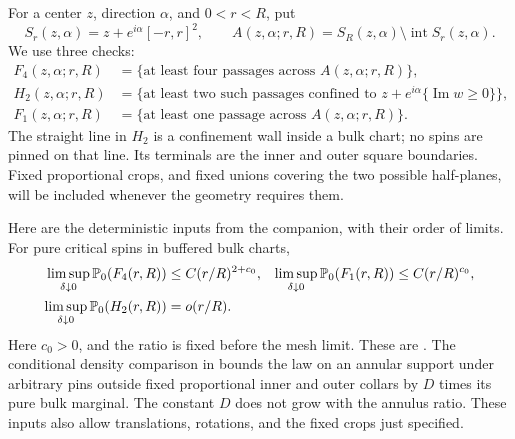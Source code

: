For a center $z$, direction $\alpha$, and $0<r<R$, put
\[
 S_r(z,\alpha)=z+e^{i\alpha}[-r,r]^2,
 \qquad A(z,\alpha;r,R)=S_R(z,\alpha)\setminus\operatorname{int}S_r(z,\alpha).
\]
We use three checks:
\begin{align}
 F_4(z,\alpha;r,R)&=\{\text{at least four passages across }A(z,\alpha;r,R)\},
 \nonumber\\
 H_2(z,\alpha;r,R)&=\{\text{at least two such passages confined to }
 z+e^{i\alpha}\{\operatorname{Im}w\geq0\}\},
 \label{cross:checks}\\
 F_1(z,\alpha;r,R)&=\{\text{at least one passage across }A(z,\alpha;r,R)\}.
 \nonumber
\end{align}
The straight line in $H_2$ is a confinement wall inside a bulk chart;
no spins are pinned on that line.  Its terminals are the inner and outer
square boundaries.  Fixed proportional crops, and fixed unions covering
the two possible half-planes, will be included whenever the geometry
requires them.

Here are the deterministic inputs from the companion, with
their order of limits.  For pure critical spins in buffered bulk charts,
\begin{equation}
 \begin{aligned}
 \limsup_{\delta\downarrow0}\mathbb P_0(F_4(r,R))
 &\leq C(r/R)^{2+c_0},&
 \limsup_{\delta\downarrow0}\mathbb P_0(F_1(r,R))
 &\leq C(r/R)^{c_0},\\
 \limsup_{\delta\downarrow0}\mathbb P_0(H_2(r,R))&=o(r/R).
 \end{aligned}
 \label{cross:pure-input}
\end{equation}
Here $c_0>0$, and the ratio is fixed before the mesh limit.  These are
\cite[Section~2, Propositions ``Iterated four-passage bound'' and ``Pure
buffered RSW consequences''; Section~5, Proposition ``Two bulk passages
confined to a half-plane'']{S}.  The conditional density comparison in
\cite[Section~2, Corollary ``Two collars around an annulus'']{S}
bounds the law on an annular support under arbitrary pins outside fixed
proportional inner and outer collars by $D$ times its pure bulk marginal.
The constant $D$ does not grow with the annulus ratio.  These inputs also
allow translations, rotations, and the fixed crops just specified.

